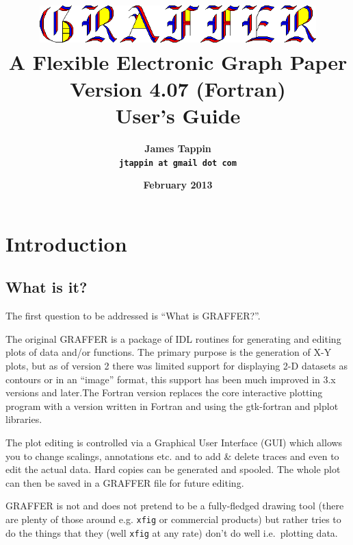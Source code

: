 \documentclass[11pt,twoside,english]{article}
\begin{document}
\title{\includegraphics[width=0.80\textwidth]{logo} \\
  A Flexible Electronic Graph Paper\\
  Version 4.07 (Fortran)\\
  User's Guide}

\author{\textsf{\textbf{\Large James Tappin}}\\
  \texttt{\textbf{\Large jtappin at gmail dot com}}}

\date{\textsf{\textbf{\large February 2013}}}

\maketitle

\begin{multicols}{2}
  \tableofcontents{}
\end{multicols}

\section{Introduction}


\subsection{What is it?}

The first question to be addressed is {}``What is GRAFFER?''.

The original GRAFFER is a package of IDL routines for generating and
editing plots of data and/or functions. The primary purpose is the
generation of X-Y plots, but as of version 2 there was limited support
for displaying 2-D datasets as contours or in an {}``image'' format,
this support has been much improved in 3.x versions and later.The
Fortran version replaces the core interactive plotting program with a
version written in Fortran and using the gtk-fortran and plplot
libraries. 

The plot editing is controlled via a Graphical User Interface (GUI)
which allows you to change scalings, annotations etc. and to add \&
delete traces and even to edit the actual data. Hard copies can be
generated and spooled. The whole plot can then be saved in a GRAFFER
file for future editing.

GRAFFER is not and does not pretend to be a fully-fledged drawing tool
(there are plenty of those around e.g. \texttt{xfig} or commercial
products) but rather tries to do the things that they (well
\texttt{xfig} at any rate) don't do well i.e.\ plotting data.
\end{document}
